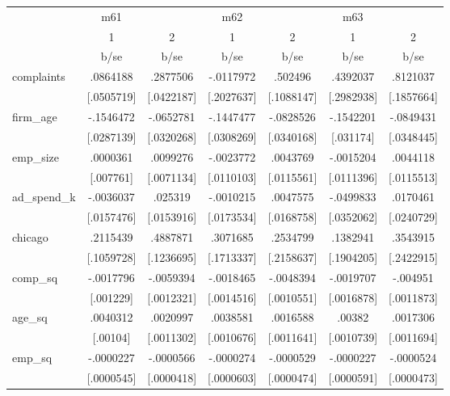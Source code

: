 \begin{tabular}{l*{6}{c}}
            &         m61&            &         m62&            &         m63&            \\
            &           1&           2&           1&           2&           1&           2\\
            &        b/se&        b/se&        b/se&        b/se&        b/se&        b/se\\
complaints  &    .0864188&    .2877506&   -.0117972&     .502496&    .4392037&    .8121037\\
            &  [.0505719]&  [.0422187]&  [.2027637]&  [.1088147]&  [.2982938]&  [.1857664]\\
firm\_age    &   -.1546472&   -.0652781&   -.1447477&   -.0828526&   -.1542201&   -.0849431\\
            &  [.0287139]&  [.0320268]&  [.0308269]&  [.0340168]&   [.031174]&  [.0348445]\\
emp\_size    &    .0000361&    .0099276&   -.0023772&    .0043769&   -.0015204&    .0044118\\
            &   [.007761]&  [.0071134]&  [.0110103]&  [.0115561]&  [.0111396]&  [.0115513]\\
ad\_spend\_k  &   -.0036037&     .025319&   -.0010215&    .0047575&   -.0499833&    .0170461\\
            &  [.0157476]&  [.0153916]&  [.0173534]&  [.0168758]&  [.0352062]&  [.0240729]\\
chicago     &    .2115439&    .4887871&    .3071685&    .2534799&    .1382941&    .3543915\\
            &  [.1059728]&  [.1236695]&  [.1713337]&  [.2158637]&  [.1904205]&  [.2422915]\\
comp\_sq     &   -.0017796&   -.0059394&   -.0018465&   -.0048394&   -.0019707&    -.004951\\
            &   [.001229]&  [.0012321]&  [.0014516]&  [.0010551]&  [.0016878]&  [.0011873]\\
age\_sq      &    .0040312&    .0020997&    .0038581&    .0016588&      .00382&    .0017306\\
            &    [.00104]&  [.0011302]&  [.0010676]&  [.0011641]&  [.0010739]&  [.0011694]\\
emp\_sq      &   -.0000227&   -.0000566&   -.0000274&   -.0000529&   -.0000227&   -.0000524\\
            &  [.0000545]&  [.0000418]&  [.0000603]&  [.0000474]&  [.0000591]&  [.0000473]\\

\end{tabular}
